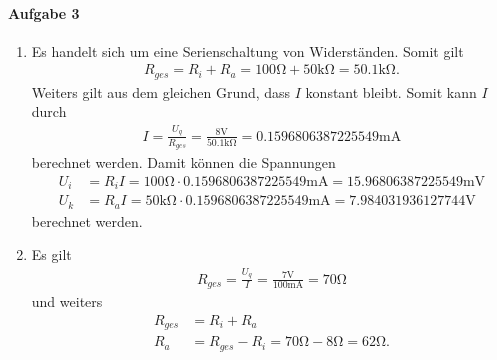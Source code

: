 \documentclass{article}
\begin{document}
\paragraph{Aufgabe 3}

\begin{enumerate}
    \item Es handelt sich um eine Serienschaltung von Widerst\"anden. Somit gilt
    \begin{align*}
        R_{ges} = R_i + R_a = 100\si{\ohm} + 50\si{\kohm} = \num{50.1}\si{\kohm}.
    \end{align*}
    Weiters gilt aus dem gleichen Grund, dass $I$ konstant bleibt. Somit kann $I$ durch
    \begin{align*}
        I = \frac{U_q}{R_{ges}} = \frac{8\si{\volt}}{50.1\si{\kohm}} = \num{0.1596806387225549}\si{\milli\ampere}
    \end{align*}
    berechnet werden. Damit k\"onnen die Spannungen
    \begin{align*}
        U_i &= R_i I = 100\si{\ohm} \cdot \num{0.1596806387225549}\si{\milli\ampere} = \num{15.96806387225549}\si{\milli\volt} \\
        U_k &= R_a I = 50\si{\kilo\ohm} \cdot \num{0.1596806387225549}\si{\milli\ampere} = \num{7.984031936127744}\si{\volt}
    \end{align*}
    berechnet werden.

    \item Es gilt
    \begin{align*}
        R_{ges} = \frac{U_q}{I} = \frac{7\si{\volt}}{100\si{\milli\ampere}} = 70\si{\ohm}
    \end{align*}
    und weiters
    \begin{align*}
        R_{ges} &= R_i + R_a \\
        R_a &= R_{ges} - R_i = 70\si{\ohm} - 8\si{\ohm} = 62\si{\ohm}.
    \end{align*}


\end{enumerate}
\end{document}
